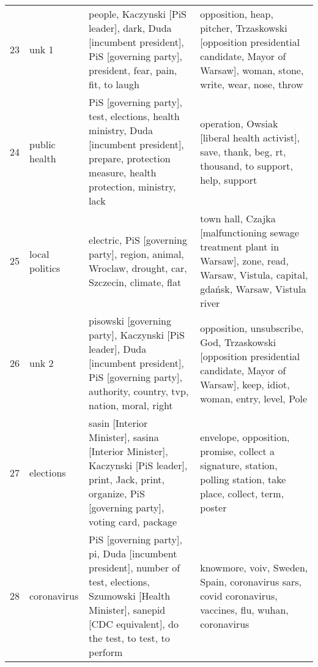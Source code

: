 \begin{tabular}{p{2cm}p{2cm}p{5cm}p{5cm}}
          23 &                    unk 1 &                                                     people, Kaczynski [PiS leader], dark, Duda [incumbent president], PiS [governing party], president, fear, pain, fit, to laugh &                                                              opposition, heap, pitcher, Trzaskowski [opposition presidential candidate, Mayor of Warsaw], woman, stone, write, wear, nose, throw \\
          24 &            public health &                               PiS [governing party], test, elections, health ministry, Duda [incumbent president], prepare, protection measure, health protection, ministry, lack &                                                                                           operation, Owsiak [liberal health activist], save, thank, beg, rt, thousand, to support, help, support \\
          25 &           local politics &                                                                                   electric, PiS [governing party], region, animal, Wroclaw, drought, car, Szczecin, climate, flat &                                                         town hall, Czajka [malfunctioning sewage treatment plant in Warsaw], zone, read, Warsaw, Vistula, capital, gdańsk, Warsaw, Vistula river \\
          26 &                    unk 2 &                              pisowski [governing party], Kaczynski [PiS leader], Duda [incumbent president], PiS [governing party], authority, country, tvp, nation, moral, right &                                                           opposition, unsubscribe, God, Trzaskowski [opposition presidential candidate, Mayor of Warsaw], keep, idiot, woman, entry, level, Pole \\
          27 &                elections &                          sasin [Interior Minister], sasina [Interior Minister], Kaczynski [PiS leader], print, Jack, print, organize, PiS [governing party], voting card, package &                                                                                  envelope, opposition, promise, collect a signature, station, polling station, take place, collect, term, poster \\
          28 &              coronavirus &         PiS [governing party], pi, Duda [incumbent president], number of test, elections, Szumowski [Health Minister], sanepid [CDC equivalent], do the test, to test, to perform &                                                                                            knowmore, voiv, Sweden, Spain, coronavirus sars, covid coronavirus, vaccines, flu, wuhan, coronavirus \\
\bottomrule
\end{tabular}
